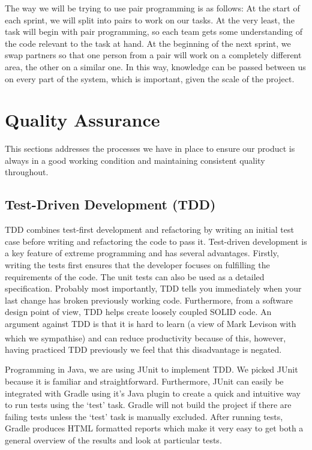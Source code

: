 \documentclass[10pt, a4paper]{article}
\begin{document}
The way we will be trying to use pair programming is as follows:
At the start of each sprint, we will split into pairs to work on our tasks. At the very least, the task will begin with pair programming, so each team gets some understanding of the code relevant to the task at hand. At the beginning of the next sprint, we swap partners so that one person from a pair will work on a completely different area, the other on a similar one. In this way, knowledge can be passed between us on every part of the system, which is important, given the scale of the project.

\section{Quality Assurance}

This sections addresses the processes we have in place to ensure our product is always in a good working condition and maintaining consistent quality throughout.

\subsection{Test-Driven Development (TDD)}

TDD combines test-first development and refactoring by writing an initial test case before writing and refactoring the code to pass it. Test-driven development is a key feature of extreme programming and has several advantages. Firstly, writing the tests first ensures that the developer focuses on fulfilling the requirements of the code. The unit tests can also be used as a detailed specification. Probably most importantly, TDD tells you immediately when your last change has broken previously working code. Furthermore, from a software design point of view, TDD helps create loosely coupled SOLID code. An argument against TDD is that it is hard to learn (a view of Mark Levison with which we sympathise\textsuperscript{\cite{mark}}) and can reduce productivity because of this, however, having practiced TDD previously we feel that this disadvantage is negated. 

Programming in Java, we are using JUnit to implement TDD. We picked JUnit because it is familiar and straightforward. Furthermore, JUnit can easily be integrated with Gradle using it’s Java plugin to create a quick and intuitive way to run tests using the ‘test’ task. Gradle will not build the project if there are failing tests unless the ‘test’ task is manually excluded. After running tests, Gradle produces HTML formatted reports which make it very easy to get both a general overview of the results and look at particular tests.
\end{document}

